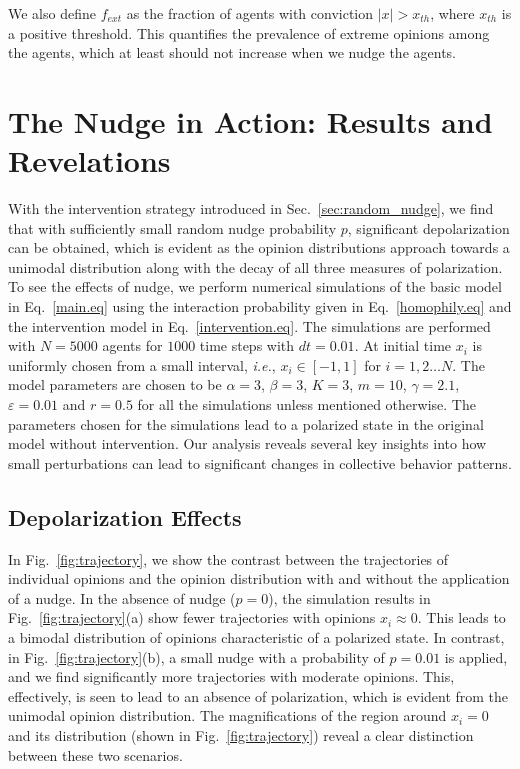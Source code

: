 We also define $f_{ext}$ as the fraction of agents with conviction $|x| > x_{th}$, where $x_{th}$ is a positive threshold. This quantifies the prevalence of extreme opinions among the agents, which at least should not increase when we nudge the agents.

\section{The Nudge in Action: Results and Revelations}
\label{sec:results}

With the intervention strategy introduced in Sec.~\ref{sec:random_nudge}, we find that with sufficiently small random nudge probability $p$, significant depolarization can be obtained, which is evident as the opinion distributions approach towards a unimodal distribution along with the decay of all three measures of polarization. To see the effects of nudge, we perform numerical simulations of the basic model in Eq.~\eqref{main.eq} using the interaction probability given in Eq.~\eqref{homophily.eq} and the intervention model in Eq.~\eqref{intervention.eq}. The simulations are performed with $N=5000$ agents for $1000$ time steps with $dt=0.01$. At initial time $x_i$ is uniformly chosen from a small interval, {\it i.e.}, $x_i \in [-1,1]$ for $i=1,2 \dots N$. The model parameters are chosen to be $\alpha=3$, $\beta=3$, $K=3$, $m=10$, $\gamma=2.1$, $\varepsilon=0.01$ and $r=0.5$ for all the simulations unless mentioned otherwise. The parameters chosen for the simulations lead to a polarized state in the original model without intervention. Our analysis reveals several key insights into how small perturbations can lead to significant changes in collective behavior patterns.

\subsection{Depolarization Effects}

In Fig.~\ref{fig:trajectory}, we show the contrast between the trajectories of individual opinions and the opinion distribution with and without the application of a nudge. In the absence of nudge ($p=0$), the simulation results in Fig.~\ref{fig:trajectory}(a) show fewer trajectories with opinions $x_i \approx 0$. This leads to a bimodal distribution of opinions characteristic of a polarized state. In contrast, in Fig.~\ref{fig:trajectory}(b), a small nudge with a probability of $p = 0.01$ is applied, and we find significantly more trajectories with moderate opinions. This, effectively, is seen to lead to an absence of polarization, which is evident from the unimodal opinion distribution. The magnifications of the region around $x_i=0$ and its distribution (shown in Fig.~\ref{fig:trajectory}) reveal a clear distinction between these two scenarios.

